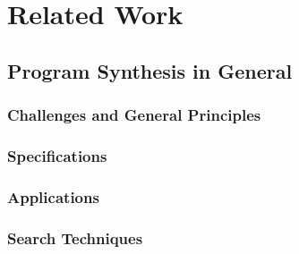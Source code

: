 
\chapter{Related Work}
\label{chapter:relatedWork}


\section{Program Synthesis in General}


\subsection{Challenges and General Principles}





\subsection{Specifications}



\subsection{Applications}



\subsection{Search Techniques}

